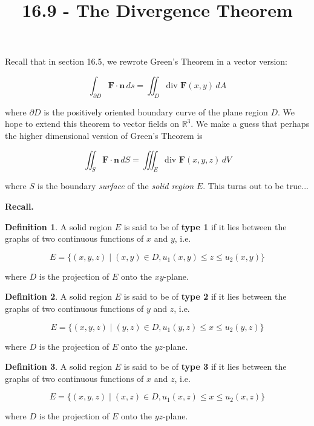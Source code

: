 \documentclass[11pt,oneside,english]{amsart}
\theoremstyle{definition}
\newtheorem*{definition}{Definition}
\newcommand{\R}{\mathbb{R}}
\begin{document}
\vspace*{-1cm}
\title{16.9 - The Divergence Theorem}
\maketitle



Recall that in section 16.5, we rewrote Green's Theorem in a vector version:

\[
\int_{\partial D}\mathbf{F}\cdot\mathbf{n}\,ds=\iint_D\text{div }\mathbf{F}(x,y)\,dA
\]

where $\partial D$ is the positively oriented boundary curve of the plane region $D$. We hope to extend this theorem to vector fields on $\R^3$. We make a guess that perhaps the higher dimensional version of Green's Theorem is

\[
\iint_S\mathbf{F}\cdot\mathbf{n}\,dS=\iiint_E\text{div }\mathbf{F}(x,y,z)\,dV
\]

where $S$ is the boundary \textit{surface} of the \textit{solid region} $E$. This turns out to be true...

\textbf{Recall.}

\begin{definition}
A solid region $E$ is said to be of \textbf{type 1} if it lies between the graphs of two continuous functions of $x$ and $y$, i.e.

\[
E=\{(x,y,z)\mid(x,y)\in D,u_1(x,y)\leq z \leq u_2(x,y)\}
\]

where $D$ is the projection of $E$ onto the $xy$-plane.
\end{definition}

\begin{definition}
A solid region $E$ is said to be of \textbf{type 2} if it lies between the graphs of two continuous functions of $y$ and $z$, i.e.

\[
E=\{(x,y,z)\mid(y,z)\in D,u_1(y,z)\leq x \leq u_2(y,z)\}
\]

where $D$ is the projection of $E$ onto the $yz$-plane.
\end{definition}

\begin{definition}
A solid region $E$ is said to be of \textbf{type 3} if it lies between the graphs of two continuous functions of $x$ and $z$, i.e.

\[
E=\{(x,y,z)\mid(x,z)\in D,u_1(x,z)\leq x \leq u_2(x,z)\}
\]

where $D$ is the projection of $E$ onto the $yz$-plane.
\end{definition}
\end{document}
